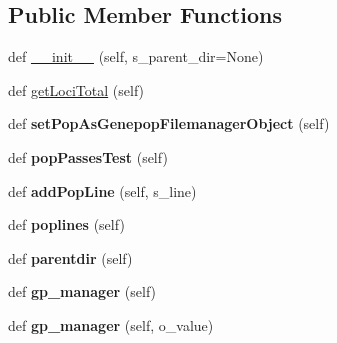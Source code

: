 \subsection*{Public Member Functions}
\begin{DoxyCompactItemize}
\item 
def \hyperlink{classnegui_1_1pgpopfilter_1_1PGPopFilter_a130cb2250b818bce6073553ddf1b4849}{\+\_\+\+\_\+init\+\_\+\+\_\+} (self, s\+\_\+parent\+\_\+dir=None)
\item 
def \hyperlink{classnegui_1_1pgpopfilter_1_1PGPopFilter_a113b227b9a532f19722810b1a394040c}{get\+Loci\+Total} (self)
\item 
def {\bfseries set\+Pop\+As\+Genepop\+Filemanager\+Object} (self)\hypertarget{classnegui_1_1pgpopfilter_1_1PGPopFilter_a8161b7be099e088eca064fd4e987b362}{}\label{classnegui_1_1pgpopfilter_1_1PGPopFilter_a8161b7be099e088eca064fd4e987b362}

\item 
def {\bfseries pop\+Passes\+Test} (self)\hypertarget{classnegui_1_1pgpopfilter_1_1PGPopFilter_a8c7d2b1e7729680311aa227ce832d294}{}\label{classnegui_1_1pgpopfilter_1_1PGPopFilter_a8c7d2b1e7729680311aa227ce832d294}

\item 
def {\bfseries add\+Pop\+Line} (self, s\+\_\+line)\hypertarget{classnegui_1_1pgpopfilter_1_1PGPopFilter_a1920e0dca873cca9a80cf7c736852b5d}{}\label{classnegui_1_1pgpopfilter_1_1PGPopFilter_a1920e0dca873cca9a80cf7c736852b5d}

\item 
def {\bfseries poplines} (self)\hypertarget{classnegui_1_1pgpopfilter_1_1PGPopFilter_aff2ee09bb65dad46875d65ccf00b178c}{}\label{classnegui_1_1pgpopfilter_1_1PGPopFilter_aff2ee09bb65dad46875d65ccf00b178c}

\item 
def {\bfseries parentdir} (self)\hypertarget{classnegui_1_1pgpopfilter_1_1PGPopFilter_a098265e6617cc753ef2a2f8558d4efbe}{}\label{classnegui_1_1pgpopfilter_1_1PGPopFilter_a098265e6617cc753ef2a2f8558d4efbe}

\item 
def {\bfseries gp\+\_\+manager} (self)\hypertarget{classnegui_1_1pgpopfilter_1_1PGPopFilter_aa6ebe687b178ac4f15662a8769d29c5c}{}\label{classnegui_1_1pgpopfilter_1_1PGPopFilter_aa6ebe687b178ac4f15662a8769d29c5c}

\item 
def {\bfseries gp\+\_\+manager} (self, o\+\_\+value)\hypertarget{classnegui_1_1pgpopfilter_1_1PGPopFilter_af84eb54260037e34ba57b646b5c83296}{}\label{classnegui_1_1pgpopfilter_1_1PGPopFilter_af84eb54260037e34ba57b646b5c83296}

\end{DoxyCompactItemize}


